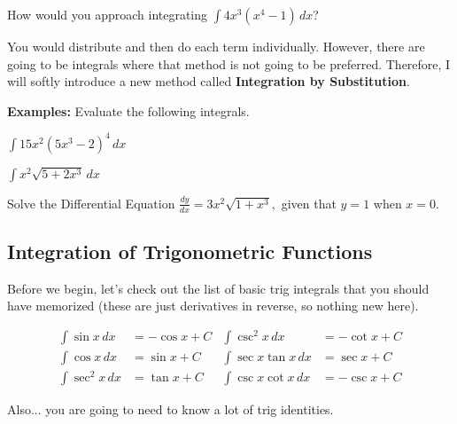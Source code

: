 \documentclass[addpoints, 12pt]{exam}
\begin{document}
How would you approach integrating $\displaystyle\int 4x^3\left(x^4-1\right)\,dx$?

You would distribute and then do each term individually. However, there are going to be integrals where that method is not going to be preferred. Therefore, I will softly introduce a new method called \textbf{Integration by Substitution}.

\noindent\textbf{Examples:} Evaluate the following integrals.
\begin{questions}
    \question $\displaystyle\int15x^2(5x^3-2)^4\,dx$
    
    \question $\displaystyle\int x^2\sqrt{5+2x^3}\,dx$
    
    Solve the Differential Equation
    \question $\displaystyle\frac{dy}{dx}=3x^2\sqrt{1+x^3},$ given that $y=1$ when $x=0$.
\end{questions}



\newpage
{}
\subsection*{Integration of Trigonometric Functions}
Before we begin, let's check out the list of basic trig integrals that you should have memorized (these are just derivatives in reverse, so nothing new here).

\begin{tcolorbox}[title= INTEGRALS OF BASIC TRIG FUNCTIONS,black,sharp corners,colback=white,colbacktitle=white,coltitle=black,boxrule=1pt]

    \begin{align*}
        \int\sin x\,dx &= -\cos x+C & \int\csc^2 x\,dx &= -\cot x+C\\
        \int\cos x\,dx &= \sin x+C & \int\sec x\tan x\,dx &= \sec x+C\\
        \int\sec^2 x\,dx &= \tan x+C & \int\csc x\cot x\,dx &= -\csc x+C
    \end{align*}
    \vspace{.05cm}
\end{tcolorbox}
Also... you are going to need to know a lot of trig identities.
\end{document}

